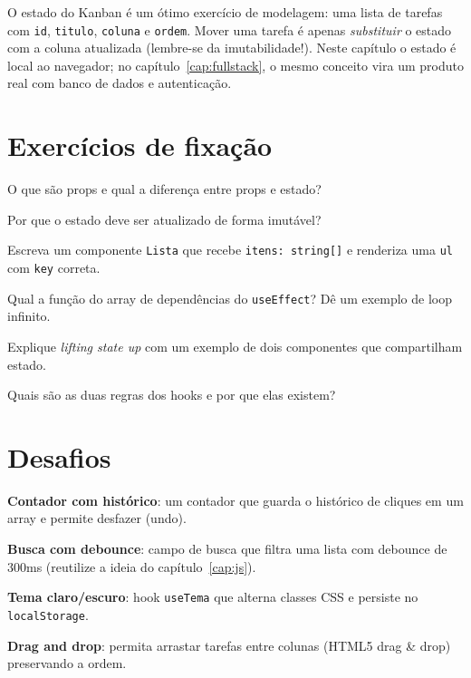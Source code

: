 \begin{caixadica}
O estado do Kanban é um ótimo exercício de modelagem: uma lista de tarefas com
\texttt{id}, \texttt{titulo}, \texttt{coluna} e \texttt{ordem}. Mover uma
tarefa é apenas \emph{substituir} o estado com a coluna atualizada (lembre-se
da imutabilidade!). Neste capítulo o estado é local ao navegador; no
capítulo~\ref{cap:fullstack}, o mesmo conceito vira um produto real com banco
de dados e autenticação.
\end{caixadica}

\section{Exercícios de fixação}

\begin{exercicios}
  \item O que são props e qual a diferença entre props e estado?
  \item Por que o estado deve ser atualizado de forma imutável?
  \item Escreva um componente \texttt{Lista} que recebe \texttt{itens: string[]} e renderiza uma \texttt{ul} com \texttt{key} correta.
  \item Qual a função do array de dependências do \texttt{useEffect}? Dê um exemplo de loop infinito.
  \item Explique \emph{lifting state up} com um exemplo de dois componentes que compartilham estado.
  \item Quais são as duas regras dos hooks e por que elas existem?
\end{exercicios}

\section{Desafios}

\begin{desafios}
  \item \textbf{Contador com histórico}: um contador que guarda o histórico de cliques em um array e permite desfazer (undo).
  \item \textbf{Busca com debounce}: campo de busca que filtra uma lista com debounce de 300ms (reutilize a ideia do capítulo~\ref{cap:js}).
  \item \textbf{Tema claro/escuro}: hook \texttt{useTema} que alterna classes CSS e persiste no \texttt{localStorage}.
  \item \textbf{Drag and drop}: permita arrastar tarefas entre colunas (HTML5 drag \& drop) preservando a ordem.
\end{desafios}

